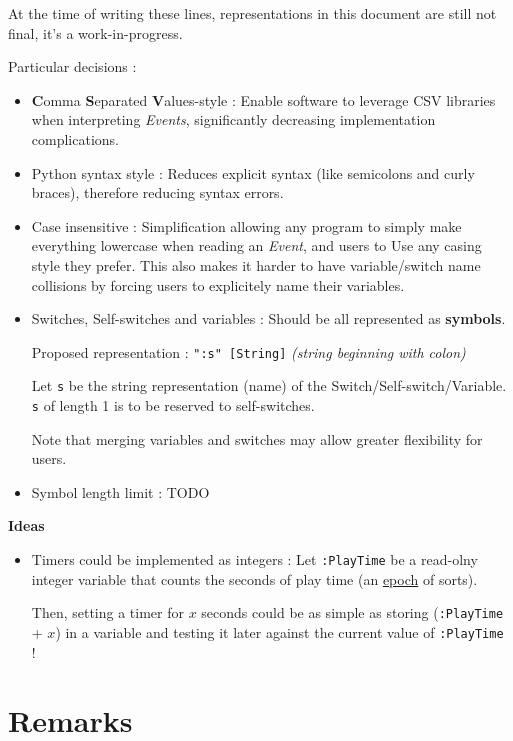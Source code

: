 \documentclass[11pt]{article}
\begin{document}
At the time of writing these lines, representations in this document are still not final, it's a work-in-progress.

Particular decisions :
\begin{itemize}
	\item \textbf{C}omma \textbf{S}eparated \textbf{V}alues-style : Enable software to leverage CSV libraries when interpreting \textit{Events}, significantly decreasing implementation complications.
	
	\item Python syntax style : Reduces explicit syntax (like semicolons and curly braces), therefore reducing syntax errors.
	
	\item Case insensitive : Simplification allowing any program to simply make everything lowercase when reading an \textit{Event}, and users to Use any casing style they prefer. This also makes it harder to have variable/switch name collisions by forcing users to explicitely name their variables.
	
	\item Switches, Self-switches and variables : Should be all represented as \textbf{symbols}. 
	
	Proposed representation : \verb|":s" [String]| \textit{(string beginning with colon)}
	
	Let \verb|s| be the string representation (name) of the Switch/Self-switch/Variable. \verb|s| of length 1 is to be reserved to self-switches.
	
	Note that merging variables and switches may allow greater flexibility for users.
	
	\item Symbol length limit : TODO
	
\end{itemize}


\textbf{Ideas}
\begin{itemize}
	\item Timers could be implemented as integers : Let \verb|:PlayTime| be a read-olny integer variable that counts the seconds of play time (an \href{https://en.wikipedia.org/wiki/Epoch_(computing)}{epoch} of sorts).
	
	Then, setting a timer for $x$ seconds could be as simple as storing (\verb|:PlayTime| + $x$) in a variable and testing it later against the current value of \verb|:PlayTime| !
\end{itemize}


\newpage
\section{Remarks}
\end{document}
